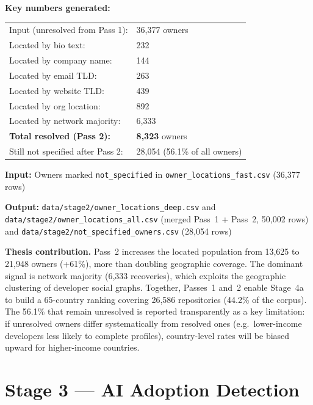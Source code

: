 \documentclass[11pt,a4paper]{article}
\begin{document}
\begin{numbersbox}
\textbf{Key numbers generated:}\\[2pt]
\begin{tabular}{@{}ll@{}}
Input (unresolved from Pass 1):  & 36,377 owners \\
Located by bio text:             & 232 \\
Located by company name:         & 144 \\
Located by email TLD:            & 263 \\
Located by website TLD:          & 439 \\
Located by org location:         & 892 \\
Located by network majority:     & 6,333 \\
\textbf{Total resolved (Pass 2):}& \textbf{8,323} owners \\
Still not specified after Pass 2:& 28,054 (56.1\% of all owners) \\
\end{tabular}
\end{numbersbox}

\textbf{Input:} Owners marked \texttt{not\_specified} in
\texttt{owner\_locations\_fast.csv} (36,377 rows)

\textbf{Output:} \texttt{data/stage2/owner\_locations\_deep.csv} and
\texttt{data/stage2/owner\_locations\_all.csv} (merged Pass~1 + Pass~2,
50,002 rows) and \texttt{data/stage2/not\_specified\_owners.csv} (28,054 rows)

\begin{outputbox}
\textbf{Thesis contribution.}
Pass~2 increases the located population from 13,625 to 21,948 owners
(+61\%), more than doubling geographic coverage. The dominant signal
is network majority (6,333 recoveries), which exploits the geographic
clustering of developer social graphs. Together, Passes~1 and~2 enable
Stage~4a to build a 65-country ranking covering 26,586 repositories
(44.2\% of the corpus). The 56.1\% that remain unresolved is reported
transparently as a key limitation: if unresolved owners differ
systematically from resolved ones (e.g.\ lower-income developers
less likely to complete profiles), country-level rates will be biased upward
for higher-income countries.
\end{outputbox}

\newpage

\section{Stage 3 --- AI Adoption Detection}
\end{document}

